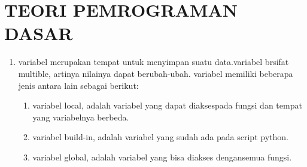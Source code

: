 \chapter{TEORI PEMROGRAMAN DASAR}

\begin{enumerate}
	\item  variabel merupakan tempat untuk menyimpan suatu data.variabel brsifat multible, artinya nilainya  dapat berubah-ubah. variabel memiliki beberapa jenis antara lain sebagai berikut:
	\begin{enumerate}
	        \item  variabel local, adalah variabel yang dapat diaksespada fungsi dan tempat yang variabelnya berbeda.
	        \item  variabel build-in, adalah variabel yang sudah ada pada script python.
	        \item variabel global, adalah variabel yang bisa diakses dengansemua fungsi.
	\end{enumerate}
	       

\end{enumerate}

